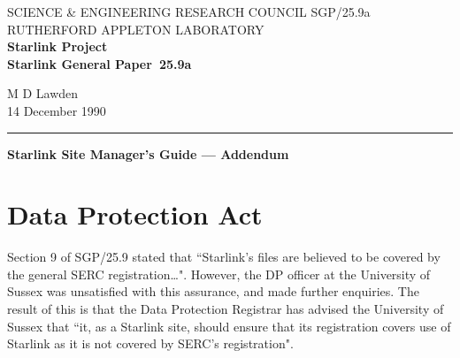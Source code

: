 \pagestyle{myheadings}

\newcommand{\stardoccategory}  {Starlink General Paper}
\newcommand{\stardocinitials}  {SGP}
\newcommand{\stardocnumber}    {25.9a}
\newcommand{\stardocauthors}   {M D Lawden}
\newcommand{\stardocdate}      {14 December 1990}
\newcommand{\stardoctitle}     {Starlink Site Manager's Guide --- Addendum}

\newcommand{\stardocname}{\stardocinitials /\stardocnumber}
\renewcommand{\_}{{\tt\char'137}}     %
\markright{\stardocname}
\setlength{\textwidth}{160mm}
\setlength{\textheight}{240mm}
\setlength{\topmargin}{-5mm}
\setlength{\oddsidemargin}{0mm}
\setlength{\evensidemargin}{0mm}
\setlength{\parindent}{0mm}
\setlength{\parskip}{\medskipamount}
\setlength{\unitlength}{1mm}


\thispagestyle{empty}
SCIENCE \& ENGINEERING RESEARCH COUNCIL \hfill \stardocname\\
RUTHERFORD APPLETON LABORATORY\\
{\large\bf Starlink Project\\}
{\large\bf \stardoccategory\ \stardocnumber}
\begin{flushright}
\stardocauthors\\
\stardocdate
\end{flushright}
\vspace{-4mm}
\rule{\textwidth}{0.5mm}
\vspace{5mm}
\begin{center}
{\Large\bf \stardoctitle}
\end{center}
\vspace{5mm}

\section{Data Protection Act}

Section 9 of SGP/25.9 stated that ``Starlink's files are believed to be
covered by the general SERC registration\ldots".
However, the DP officer at the University of Sussex was unsatisfied with
this assurance, and made further enquiries.
The result of this is that the Data Protection Registrar has advised the
University of Sussex that ``it, as a Starlink site, should ensure
that its registration covers use of Starlink as it is not covered by
SERC's registration".

